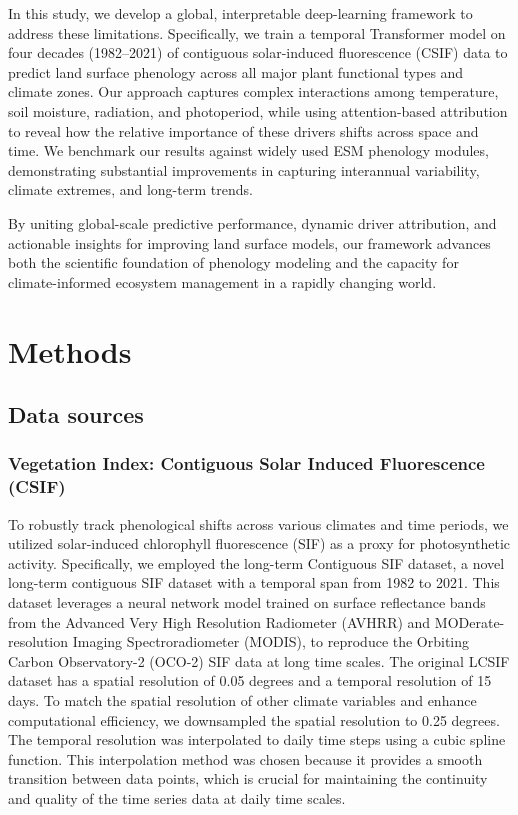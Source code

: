 \documentclass[pdflatex,sn-mathphys-num]{sn-jnl}%
\theoremstyle{thmstyleone}%
\theoremstyle{thmstyletwo}%
\theoremstyle{thmstylethree}%
\begin{document}
In this study, we develop a global, interpretable deep-learning framework to address these limitations. Specifically, we train a temporal Transformer model on four decades (1982–2021) of contiguous solar-induced fluorescence (CSIF) data to predict land surface phenology across all major plant functional types and climate zones. Our approach captures complex interactions among temperature, soil moisture, radiation, and photoperiod, while using attention-based attribution to reveal how the relative importance of these drivers shifts across space and time. We benchmark our results against widely used ESM phenology modules, demonstrating substantial improvements in capturing interannual variability, climate extremes, and long-term trends.

By uniting global-scale predictive performance, dynamic driver attribution, and actionable insights for improving land surface models, our framework advances both the scientific foundation of phenology modeling and the capacity for climate-informed ecosystem management in a rapidly changing world.


\section{Methods}\label{sec5}

\subsection{Data sources}\label{subsec2}
\subsubsection{Vegetation Index: Contiguous Solar Induced Fluorescence (CSIF)}\label{subsubsec2}
To robustly track phenological shifts across various climates and time periods, we utilized solar-induced chlorophyll fluorescence (SIF) as a proxy for photosynthetic activity. Specifically, we employed the long-term Contiguous SIF dataset, a novel long-term contiguous SIF dataset with a temporal span from 1982 to 2021\cite{fang_reconstruction_2024}. This dataset leverages a neural network model trained on surface reflectance bands from the Advanced Very High Resolution Radiometer (AVHRR) and MODerate-resolution Imaging Spectroradiometer (MODIS), to reproduce the Orbiting Carbon Observatory-2 (OCO-2) SIF data at long time scales.
The original LCSIF dataset has a spatial resolution of 0.05 degrees and a temporal resolution of 15 days. To match the spatial resolution of other climate variables and enhance computational efficiency, we downsampled the spatial resolution to 0.25 degrees. The temporal resolution was interpolated to daily time steps using a cubic spline function. This interpolation method was chosen because it provides a smooth transition between data points, which is crucial for maintaining the continuity and quality of the time series data at daily time scales.
\end{document}

